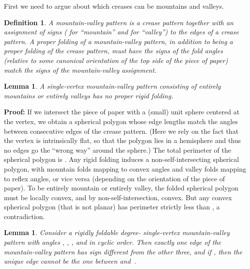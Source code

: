 \documentclass[11pt,letterpaper]{article}
\newtheorem{lemma}[theorem]{Lemma}
\newtheorem{definition}{Definition}
\newenvironment{proof}{\noindent\textbf{Proof: }\ignorespaces}
  {\hspace*{\fill}\medskip}
\newcommand\term[1]{\emph{#1}}
\begin{document}
First we need to argue about which creases can be mountains and valleys.

\begin{definition}
  A \term{mountain-valley pattern} is a crease pattern together with
  an assignment of signs ( for ``mountain'' and  for ``valley'')
  to the edges of a crease pattern.
  A \term{proper folding} of a mountain-valley pattern,
  in addition to being a proper folding of the crease pattern,
  must have the signs of the fold angles (relative to some canonical
  orientation of the top side of the piece of paper) match the signs of the
  mountain-valley assignment.
\end{definition}

\begin{lemma} \label{not all mountains}
  A single-vertex mountain-valley pattern consisting of entirely mountains
  or entirely valleys has no proper rigid folding.
\end{lemma}

\begin{proof}
  If we intersect the piece of paper with a (small) unit sphere centered
  at the vertex, we obtain a spherical polygon whose edge lengths match the
  angles between consecutive edges of the crease pattern.
  (Here we rely on the fact that the vertex is intrinsically flat,
   so that the polygon lies in a hemisphere and thus no edges go
   the ``wrong way'' around the sphere.)
  The total perimeter of the spherical polygon is .
  Any rigid folding induces a non-self-intersecting spherical polygon,
  with mountain folds mapping to convex angles and
  valley folds mapping to reflex angles, or vice versa
  (depending on the orientation of the piece of paper).
  To be entirely mountain or entirely valley,
  the folded spherical polygon must be locally convex,
  and by non-self-intersection, convex.
  But any convex spherical polygon (that is not planar) has perimeter
  strictly less than  \cite[page~265, Theorem~IV]{Halsted-1885},
  a contradiction.
\end{proof}

\begin{lemma} \label{degree 4}
  Consider a rigidly foldable degree- single-vertex mountain-valley
  pattern with angles , , , and 
  in cyclic order.
  Then exactly one edge of the mountain-valley pattern has sign different
  from the other three, and if ,
  then the unique edge cannot be the one between  and~.
\end{lemma}
\end{document}
